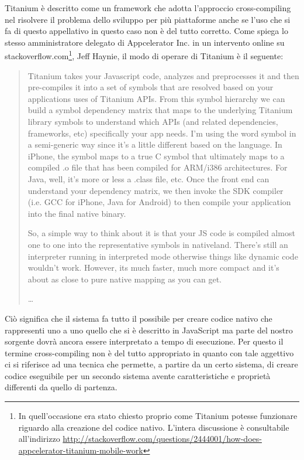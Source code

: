 			Titanium è descritto come un framework che adotta l'approccio 
			cross-compiling nel risolvere il problema dello sviluppo per più 
			piattaforme anche se l'uso che si fa di questo appellativo in 
			questo caso non è del tutto corretto. Come spiega lo stesso 
			amministratore delegato di Appcelerator Inc. in un intervento 
			online su \mbox{stackoverflow.com}\footnote{In quell'occasione era 
			stato chiesto proprio come Titanium potesse funzionare riguardo alla 
			creazione del codice nativo. L'intera discussione è consultabile 
			all'indirizzo 
			\url{http://stackoverflow.com/questions/2444001/how-does-appcelerator-titanium-mobile-work}},
			Jeff Haynie, il modo di operare di Titanium è il seguente:
			\begin{quotation}
				Titanium takes your Javascript code, analyzes and preprocesses 
				it and then pre-compiles it into a set of symbols that are 
				resolved based on your applications uses of Titanium APIs. From 
				this symbol hierarchy we can build a symbol dependency matrix 
				that maps to the underlying Titanium library symbols to 
				understand which APIs (and related dependencies, frameworks, 
				etc) specifically your app needs. I'm using the word symbol in a 
				semi-generic way since it's a little different based on the 
				language. In iPhone, the symbol maps to a true C symbol that 
				ultimately maps to a compiled .o file that has been compiled for 
				ARM/i386 architectures. For Java, well, it's more or less a 
				.class file, etc. Once the front end can understand your 
				dependency matrix, we then invoke the SDK compiler (i.e. GCC for 
				iPhone, Java for Android) to then compile your application into 
				the final native binary.
				
				So, a simple way to think about it is that your JS code is 
				compiled almost one to one into the representative symbols in 
				nativeland. There's still an interpreter running in interpreted 
				mode otherwise things like dynamic code wouldn't work. However, 
				its much faster, much more compact and it's about as close to 
				pure native mapping as you can get.
				
				\ldots
			\end{quotation}
			Ciò significa che il sistema fa tutto il possibile per creare codice 
			nativo che rappresenti uno a uno quello che si è descritto in 
			JavaScript ma parte del nostro sorgente dovrà ancora essere 
			interpretato a tempo di esecuzione. Per questo il termine 
			cross-compiling non è del tutto appropriato in quanto con tale 
			aggettivo ci si riferisce ad una tecnica che permette, a partire da 
			un certo sistema, di creare codice eseguibile per un secondo sistema 
			avente caratteristiche e proprietà differenti da quello di 
			partenza\citep{Web:Wiki.cross-compiling}.
			
